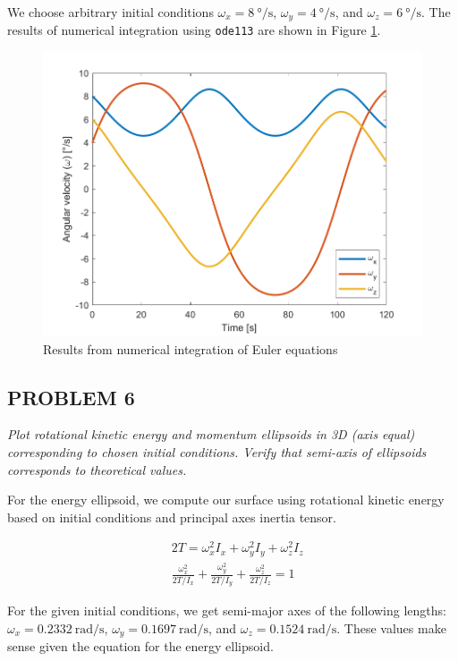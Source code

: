 We choose arbitrary initial conditions $\omega_{x} = \qty{8}{\degree\per\second}$, $\omega_{y} = \qty{4}{\degree\per\second}$, and $\omega_{z} = \qty{6}{\degree\per\second}$. The results of numerical integration using \texttt{ode113} are shown in Figure \ref{fig:ps2_euler_equations}.

\begin{figure}[H]
\centering
\includegraphics[scale=0.6]{Images/ps2_euler_equations.png}
\caption{Results from numerical integration of Euler equations}
\label{fig:ps2_euler_equations}
\end{figure}


\subsection{PROBLEM 6}
\textit{Plot rotational kinetic energy and momentum ellipsoids in 3D (axis equal) corresponding to chosen initial conditions. Verify that semi-axis of ellipsoids corresponds to theoretical values.}

For the energy ellipsoid, we compute our surface using rotational kinetic energy based on initial conditions and principal axes inertia tensor.

\begin{align*}
    &2T = \omega_{x}^{2} I_{x} + \omega_{y}^{2} I_{y} + \omega_{z}^{2} I_{z} \\
    &\frac{\omega_{x}^{2}}{2T/I_{x}} + \frac{\omega_{y}^{2}}{2T/I_{y}} + \frac{\omega_{z}^{2}}{2T/I_{z}} = 1
\end{align*}

For the given initial conditions, we get semi-major axes of the following lengths: $\omega_{x} = \qty{0.2332}{\radian\per\second}$, $\omega_{y} = \qty{0.1697}{\radian\per\second}$, and $\omega_{z} = \qty{0.1524}{\radian\per\second}$. These values make sense given the equation for the energy ellipsoid.


